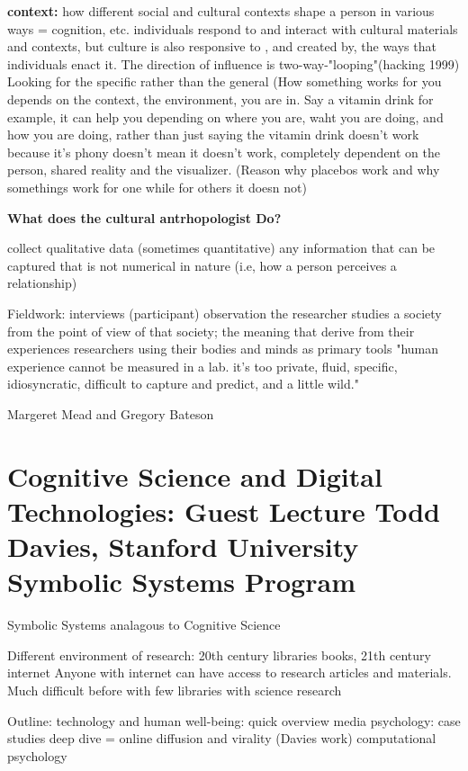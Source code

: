 \documentclass{article}
\begin{document}
    \textbf{context:} how different social and cultural contexts shape a person in various ways = cognition, etc. 
    individuals respond to and interact with cultural materials and contexts, but culture is also responsive to , and created by, the ways that individuals enact it. The direction of influence is two-way-"looping"(hacking 1999) 
    Looking for the specific rather than the general
    (How something works for you depends on the context, the environment, you are in. Say a vitamin drink for example, it can help you depending on where you are, waht you are doing, and how you are doing, rather than just saying the vitamin drink doesn't work because it's phony doesn't mean it doesn't work, completely dependent on the person, shared reality and the visualizer. (Reason why placebos work and why somethings work for one while for others it doesn not) 
    
\textbf{What does the cultural antrhopologist Do?}

collect qualitative data (sometimes quantitative) 
    any information that can be captured that is not numerical in nature (i.e, how a person perceives a relationship) 
    
Fieldwork: interviews (participant) observation
    the researcher studies a society from the point of view of that society; the meaning that derive from their experiences
    researchers using their bodies and minds as primary tools
    "human experience cannot be measured in a lab. it's too private, fluid, specific, idiosyncratic, difficult to capture and predict, and a little wild." 

Margeret Mead and Gregory Bateson



\section{Cognitive Science and Digital Technologies: Guest Lecture Todd Davies, Stanford University Symbolic Systems Program}
Symbolic Systems analagous to Cognitive Science

Different environment of research: 20th century libraries books, 21th century internet
Anyone with internet can have access to research articles and materials. Much difficult before with few libraries with science research

Outline: 
technology and human well-being: quick overview
media psychology: case studies
deep dive = online diffusion and virality (Davies work) 
computational psychology
\end{document}
